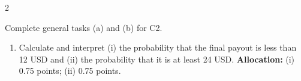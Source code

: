 \begin{multicols*}{2}
\begin{minipage}{\linewidth}
Complete general tasks (a)  and (b)  for C2.
\begin{enumerate}[label=(\alph*),start=3]
\item {} Calculate and interpret (i) the probability that the final payout is less than 12 USD and (ii) the probability that it is at least 24 USD.
\textbf{Allocation:} (i) 0.75 points; (ii) 0.75 points.
\end{enumerate}
\end{minipage}\par\medskip

\end{multicols*}


\clearpage
\begingroup %
\small
\setlength{\parskip}{0pt}\raggedright
\ExplSyntaxOn
{}
\ExplSyntaxOff
\newcommand{\ResponseBox}[1]{%
 \par\noindent\tikz{\node[fill=black!1,draw=black!25,line width=.3pt,
 rounded corners=2mm,inner sep=0pt,outer sep=.3pt,
 minimum width=\dimexpr\linewidth-.6pt\relax,minimum height=#1] {\phantom{0}};}\par}
\newcommand{\ResponseStage}[1]{%
 {\centering\large\bfseries\tikz[baseline=(title.base)]{
 \node[fill=black!10,draw=black,line width=.2pt,rounded corners=2mm,
 inner sep=3pt,outer sep=0pt] (title) {#1};}\par}\nopagebreak}
\newcommand{\ResponseTask}[1]{%
 \par\noindent\tikz[baseline=(title.base)]{\node[fill=black!5,draw=none,
 rounded corners=2mm,inner sep=3pt,outer sep=0pt] (title)
 {\strut\textbf{#1}};}\par\nopagebreak}
\newcommand{\ResponseSub}[1]{\par\textbf{\underline{#1}}\par\nopagebreak}
\newcommand{\VariableSupport}[2]{%
 \ResponseSub{Q#1 (#2): Variable, units and support}\ResponseBox{8mm}}
